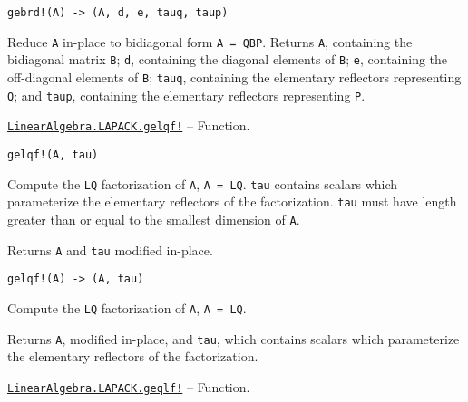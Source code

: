 \begin{adjustwidth}{2em}{0pt}


\begin{verbatim}
gebrd!(A) -> (A, d, e, tauq, taup)
\end{verbatim}

Reduce \texttt{A} in-place to bidiagonal form \texttt{A = QBP{\textquotesingle}}. Returns \texttt{A}, containing the bidiagonal matrix \texttt{B}; \texttt{d}, containing the diagonal elements of \texttt{B}; \texttt{e}, containing the off-diagonal elements of \texttt{B}; \texttt{tauq}, containing the elementary reflectors representing \texttt{Q}; and \texttt{taup}, containing the elementary reflectors representing \texttt{P}.



\end{adjustwidth}
\hypertarget{13832119342643409982}{}
\hyperlink{13832119342643409982}{\texttt{LinearAlgebra.LAPACK.gelqf!}}  -- {Function.}

\begin{adjustwidth}{2em}{0pt}


\begin{verbatim}
gelqf!(A, tau)
\end{verbatim}

Compute the \texttt{LQ} factorization of \texttt{A}, \texttt{A = LQ}. \texttt{tau} contains scalars which parameterize the elementary reflectors of the factorization. \texttt{tau} must have length greater than or equal to the smallest dimension of \texttt{A}.

Returns \texttt{A} and \texttt{tau} modified in-place.




\begin{lstlisting}
gelqf!(A) -> (A, tau)
\end{lstlisting}

Compute the \texttt{LQ} factorization of \texttt{A}, \texttt{A = LQ}.

Returns \texttt{A}, modified in-place, and \texttt{tau}, which contains scalars which parameterize the elementary reflectors of the factorization.



\end{adjustwidth}
\hypertarget{870700918778332837}{}
\hyperlink{870700918778332837}{\texttt{LinearAlgebra.LAPACK.geqlf!}}  -- {Function.}

